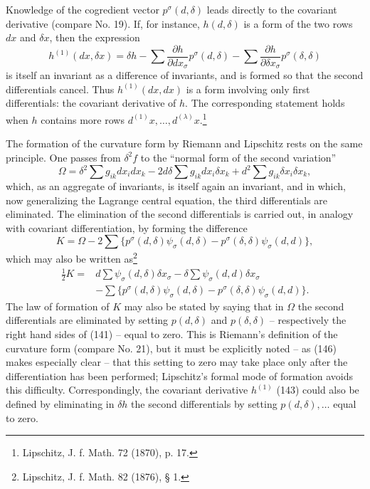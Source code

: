\documentclass[11pt]{article}
\begin{document}
Knowledge of the cogredient vector $p^\sigma(d,\delta)$ leads directly to the covariant derivative (compare No. 19). If, for instance, $h(d,\delta)$ is a form of the two rows $dx$ and $\delta x$, then the expression
\begin{equation}
 h^{(1)}(dx,\delta x)=\delta h-
 \sum\frac{\partial h}{\partial dx_\sigma}p^\sigma(d,\delta)-
 \sum\frac{\partial h}{\partial \delta x_\sigma}p^\sigma(\delta,\delta)
\tag{143}
\end{equation}
is itself an invariant as a difference of invariants, and is formed so that the second differentials cancel. Thus $h^{(1)}(dx,dx)$ is a form involving only first differentials: the covariant derivative of $h$. The corresponding statement holds when $h$ contains more rows $d^{(1)}x,\ldots,d^{(\lambda)}x$.\footnote{Lipschitz, J. f. Math. 72 (1870), p. 17.}

The formation of the curvature form by Riemann and Lipschitz rests on the same principle. One passes from $\delta^2f$ to the ``normal form of the second variation''
\begin{equation}
 \Omega=\delta^2\sum g_{ik}dx_i dx_k
 -2d\delta\sum g_{ik}dx_i\delta x_k
 +d^2\sum g_{ik}\delta x_i\delta x_k,
\tag{144}
\end{equation}
which, as an aggregate of invariants, is itself again an invariant, and in which, now generalizing the Lagrange central equation, the third differentials are eliminated. The elimination of the second differentials is carried out, in analogy with covariant differentiation, by forming the difference
\begin{equation}
 K=\Omega-2\sum\{p^\sigma(d,\delta)\psi_\sigma(d,\delta)-p^\sigma(\delta,\delta)\psi_\sigma(d,d)\},
\tag{145}
\end{equation}
which may also be written as\footnote{Lipschitz, J. f. Math. 82 (1876), § 1.}
\begin{equation}
\begin{aligned}
 \frac12 K={}&d\sum\psi_\sigma(d,\delta)\delta x_\sigma
 -\delta\sum\psi_\sigma(d,d)\delta x_\sigma\\
 &-\sum\{p^\sigma(d,\delta)\psi_\sigma(d,\delta)-p^\sigma(\delta,\delta)\psi_\sigma(d,d)\}.
\end{aligned}
\tag{146}
\end{equation}
The law of formation of $K$ may also be stated by saying that in $\Omega$ the second differentials are eliminated by setting $p(d,\delta)$ and $p(\delta,\delta)$ -- respectively the right hand sides of (141) -- equal to zero. This is Riemann's definition of the curvature form (compare No. 21), but it must be explicitly noted -- as (146) makes especially clear -- that this setting to zero may take place only after the differentiation has been performed; Lipschitz's formal mode of formation avoids this difficulty. Correspondingly, the covariant derivative $h^{(1)}$ (143) could also be defined by eliminating in $\delta h$ the second differentials by setting $p(d,\delta),\ldots$ equal to zero.
\end{document}
